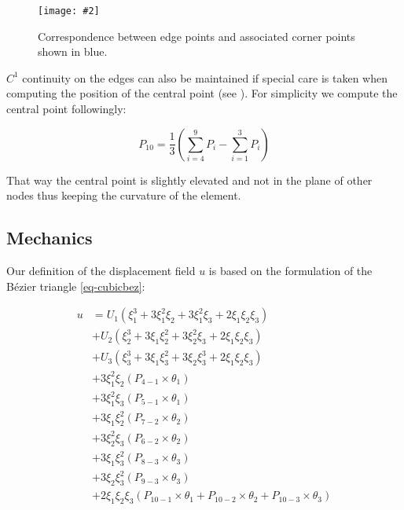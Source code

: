 \documentclass{egpubl}
\newcommand{\Figure}[3]{%
\begin{figure}[htb]
  \centering
  \texttt{[image: \#2]}
  \caption{\label{fig-#2}#3}
\end{figure}}
\begin{document}
\Figure{0.8\linewidth}{segments}
{Correspondence between edge points and associated corner points shown in
blue.}

$C^1$ continuity on the edges can also be maintained if special care is taken
when computing the position of the central point (see \cite{Ubach2010}). For
simplicity we compute the central point followingly:

\begin{equation}\label{eq-central}
    P_{10} = \frac{1}{3}(\sum_{i=4}^9 P_i - \sum_{i=1}^3 P_i)
\end{equation}


That way the central point is slightly elevated and not in the plane of
other nodes thus keeping the curvature of the element.



\subsection{Mechanics} %

Our definition of the displacement field $u$ is based on the formulation of the
Bézier triangle \eqref{eq-cubicbez}:

\begin{equation}\label{eq-bezU}
\begin{split}
  u & = U_1 ( \xi_1^3 + 3 \xi_1^2 \xi_2 + 3 \xi_1^2 \xi_3
        + 2 \xi_1 \xi_2 \xi_3 ) \\
    & + U_2 ( \xi_2^3 + 3 \xi_1 \xi_2^2 + 3 \xi_2^2 \xi_3
        + 2 \xi_1 \xi_2 \xi_3 ) \\
    & + U_3 ( \xi_3^3 + 3 \xi_1 \xi_3^2 + 3 \xi_2 \xi_3^3
        + 2 \xi_1 \xi_2 \xi_3 ) \\
    & + 3 \xi_1^2 \xi_2 (P_{4-1} \times \theta_1) \\
    & + 3 \xi_1^2 \xi_3 (P_{5-1} \times \theta_1) \\
    & + 3 \xi_1 \xi_2^2 (P_{7-2} \times \theta_2) \\
    & + 3 \xi_2^2 \xi_3 (P_{6-2} \times \theta_2) \\
    & + 3 \xi_1 \xi_3^2 (P_{8-3} \times \theta_3) \\
    & + 3 \xi_2 \xi_3^2 (P_{9-3} \times \theta_3) \\
    & + 2 \xi_1 \xi_2 \xi_3 (P_{10-1} \times \theta_1 +
        P_{10-2} \times \theta_2 +
        P_{10-3} \times \theta_3)
\end{split}
\end{equation}
\end{document}
